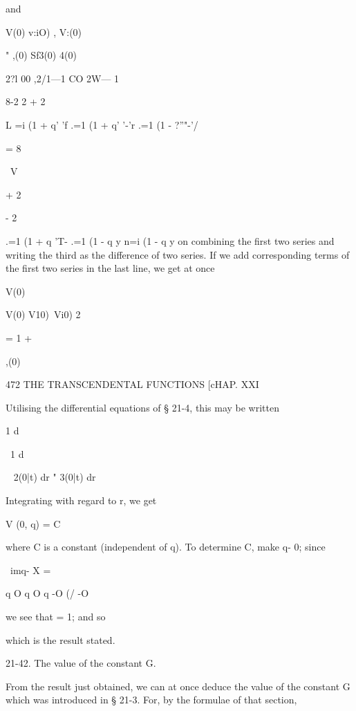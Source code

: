 and



V(0) v:iO) , V:(0)

" ,(0) Sf3(0) 4(0)



 2?l 00 ,2/1—1 CO 2W— 1



8-2 2 + 2

L =i (1 + q' 'f .=1 (1 + q' '-'r .=1 (1 - ?''"-'/



= 8



\ V



+ 2



- 2



.=1 (1 + q 'T- .=1 (1 - q y n=i (1 - q y on combining the first two
series and writing the third as the difference of two series. If we
add corresponding terms of the first two series in the last line, we
get at once

V(0)



 V(0) V10)\ Vi0) 2



= 1 +



 ,(0) %



472 THE TRANSCENDENTAL FUNCTIONS [cHAP. XXI

Utilising the differential equations of § 21-4, this may be written

1 d%

\ 1 d%

~ 2(0|t) dr " 3(0|t) dr %

Integrating with regard to r, we get

V (0, q) = C%

where C is a constant (independent of q). To determine C, make q- 0;
since

\ imq- X = %

q O q O q -O (/ -O

we see that = 1; and so

which is the result stated.

21-42. The value of the constant G.

From the result just obtained, we can at once deduce the value of the
constant G which was introduced in § 21-3. For, by the formulae of
that section,

